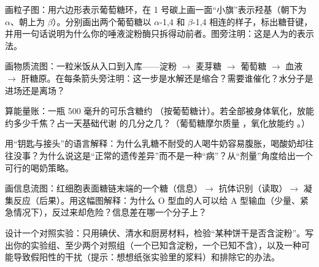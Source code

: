 \begin{sikaoti}
\item 画粒子图：用六边形表示葡萄糖环，在 1 号碳上画一面“小旗”表示羟基（朝下为 $\alpha$、朝上为 $\beta$）。分别画出两个葡萄糖以 $\alpha$-1,4 和 $\beta$-1,4 相连的样子，标出糖苷键，并用一句话说明为什么你的唾液淀粉酶只拆得动前者。图旁注明：这是人为的表示法。
\item 画物质流图：一粒米饭从入口到入库——淀粉 $\rightarrow$ 麦芽糖 $\rightarrow$ 葡萄糖 $\rightarrow$ 血液 $\rightarrow$ 肝糖原。在每条箭头旁注明：这一步是水解还是缩合？需要谁催化？水分子是进场还是离场？
\item 算能量账：一瓶 500 毫升的可乐含糖约 （按葡萄糖计）。若全部被身体氧化，放能约多少千焦？占一天基础代谢  的几分之几？（葡萄糖摩尔质量 ，氧化放能约 。）
\item 用“钥匙与接头”的语言解释：为什么乳糖不耐受的人喝牛奶容易腹胀，喝酸奶却往往没事？为什么说这是“正常的遗传差异”而不是一种“病”？从“剂量”角度给出一个可行的喝奶策略。
\item 画信息流图：红细胞表面糖链末端的一个糖（信息）$\rightarrow$ 抗体识别（读取）$\rightarrow$ 凝集反应（后果）。用这幅图解释：为什么 O 型血的人可以给 A 型输血（少量、紧急情况下），反过来却危险？信息差在哪一个分子上？
\item 设计一个对照实验：只用碘伏、清水和厨房材料，检验“某种饼干是否含淀粉”。写出你的实验组、至少两个对照组（一个已知含淀粉，一个已知不含），以及一种可能导致假阳性的干扰（提示：想想纸张实验里的浆料）和排除它的办法。
\end{sikaoti}
